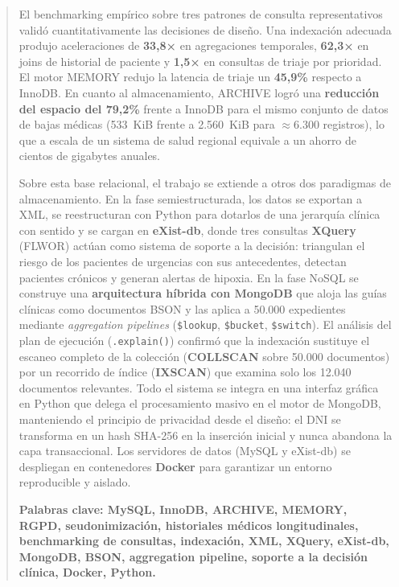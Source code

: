\documentclass[../main.tex]{subfiles}
\begin{document}
\begin{abstract}
El benchmarking empírico sobre tres patrones de consulta representativos validó cuantitativamente las decisiones de diseño. Una indexación adecuada produjo aceleraciones de \textbf{33,8×} en agregaciones temporales, \textbf{62,3×} en joins de historial de paciente y \textbf{1,5×} en consultas de triaje por prioridad. El motor MEMORY redujo la latencia de triaje un \textbf{45,9\%} respecto a InnoDB. En cuanto al almacenamiento, ARCHIVE logró una \textbf{reducción del espacio del 79,2\%} frente a InnoDB para el mismo conjunto de datos de bajas médicas (533~KiB frente a 2.560~KiB para $\approx$6.300 registros), lo que a escala de un sistema de salud regional equivale a un ahorro de cientos de gigabytes anuales.

Sobre esta base relacional, el trabajo se extiende a otros dos paradigmas de almacenamiento. En la fase semiestructurada, los datos se exportan a XML, se reestructuran con Python para dotarlos de una jerarquía clínica con sentido y se cargan en \textbf{eXist-db}, donde tres consultas \textbf{XQuery} (FLWOR) actúan como sistema de soporte a la decisión: triangulan el riesgo de los pacientes de urgencias con sus antecedentes, detectan pacientes crónicos y generan alertas de hipoxia. En la fase NoSQL se construye una \textbf{arquitectura híbrida con MongoDB} que aloja las guías clínicas como documentos BSON y las aplica a 50.000 expedientes mediante \textit{aggregation pipelines} (\texttt{\$lookup}, \texttt{\$bucket}, \texttt{\$switch}). El análisis del plan de ejecución (\texttt{.explain()}) confirmó que la indexación sustituye el escaneo completo de la colección (\textbf{COLLSCAN} sobre 50.000 documentos) por un recorrido de índice (\textbf{IXSCAN}) que examina solo los 12.040 documentos relevantes. Todo el sistema se integra en una interfaz gráfica en Python que delega el procesamiento masivo en el motor de MongoDB, manteniendo el principio de privacidad desde el diseño: el DNI se transforma en un hash SHA-256 en la inserción inicial y nunca abandona la capa transaccional. Los servidores de datos (MySQL y eXist-db) se despliegan en contenedores \textbf{Docker} para garantizar un entorno reproducible y aislado.

\bigskip
\noindent\bfseries{\large{Palabras clave:}} MySQL, InnoDB, ARCHIVE, MEMORY, RGPD, seudonimización, historiales médicos longitudinales, benchmarking de consultas, indexación, XML, XQuery, eXist-db, MongoDB, BSON, aggregation pipeline, soporte a la decisión clínica, Docker, Python.

\end{abstract}
\end{document}
